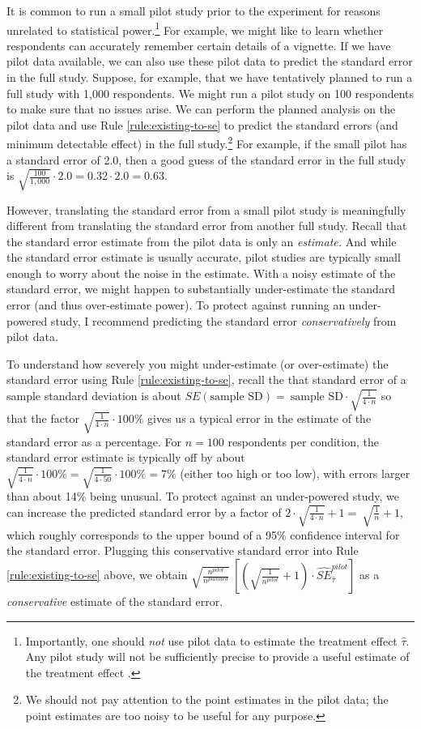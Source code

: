 \documentclass[12pt]{article}
\begin{document}
It is common to run a small pilot study prior to the experiment for reasons unrelated to statistical power.\footnote{
  Importantly, one should \textit{not} use pilot data to estimate the treatment effect $\widehat{\tau}$. 
  Any pilot study will not be sufficiently precise to provide a useful estimate of the treatment effect \cite{Leon2011, Albers2018}.
  }
For example, we might like to learn whether respondents can accurately remember certain details of a vignette. 
If we have pilot data available, we can also use these pilot data to predict the standard error in the full study. 
Suppose, for example, that we have tentatively planned to run a full study with 1,000 respondents. 
We might run a pilot study on 100 respondents to make sure that no issues arise. 
We can perform the planned analysis on the pilot data and use Rule \ref{rule:existing-to-se} to predict the standard errors (and minimum detectable
effect) in the full study.\footnote{We should not pay attention to the
point estimates in the pilot data; the point estimates are too noisy to
be useful for any purpose.} 
For example, if the small pilot has a standard error of 2.0, then a good guess of the standard error in the full study is $\sqrt{\frac{100}{1,000}} \cdot 2.0 = 0.32 \cdot 2.0 = 0.63$.

However, translating the standard error from a small pilot study is meaningfully different from translating the standard error from another full study. Recall that the standard error estimate from the pilot data is only an \emph{estimate.} 
And while the standard error estimate is usually accurate, pilot studies are typically small enough to worry about the noise in the estimate.
With a noisy estimate of the standard error, we might happen to substantially under-estimate the standard error (and thus over-estimate power). 
To protect against running an under-powered study, I recommend predicting the standard error \emph{conservatively} from pilot data. 

To understand how severely you might under-estimate (or over-estimate) the standard error using Rule \ref{rule:existing-to-se}, recall the that standard error of a sample standard deviation is about $SE\left( \text{sample SD} \right) = \ \text{sample SD} \cdot \sqrt{\frac{1}{4 \cdot n}}$ so that the factor $\sqrt{\frac{1}{4 \cdot n}} \cdot 100\%$ gives us a typical error in the estimate of the standard error as a percentage. 
For $n = 100$ respondents per condition, the standard error estimate is typically off by about $\sqrt{\frac{1}{4 \cdot n}} \cdot 100\% = \sqrt{\frac{1}{4 \cdot 50}} \cdot 100\%= 7\%$ (either too high or too low), with errors larger than about 14\% being unusual. 
To protect against an under-powered study, we can increase the predicted standard error by a factor of $2 \cdot \sqrt{\frac{1}{4 \cdot n}} + 1 = \ \sqrt{\frac{1}{n}} + 1$, which roughly corresponds to the upper bound of a 95\% confidence interval for the standard error. 
Plugging this conservative standard error into Rule \ref{rule:existing-to-se} above, we obtain $\sqrt{\frac{n^{pilot}}{n^{planned}}}\ \left\lbrack \left( \sqrt{\frac{1}{n^{pilot}}} + 1 \right) \cdot {\widehat{SE}}_{\widehat{\tau}}^{pilot} \right\rbrack$
as a \emph{conservative} estimate of the standard error. 
\end{document}

